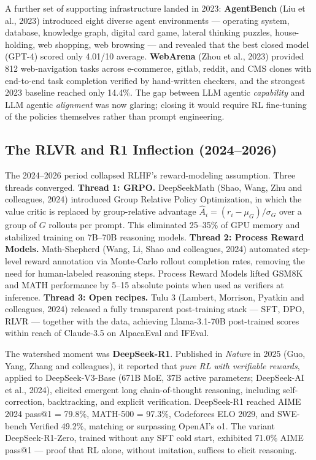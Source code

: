 A further set of supporting infrastructure landed in 2023: \textbf{AgentBench} (Liu et al., 2023) introduced eight diverse agent environments --- operating system, database, knowledge graph, digital card game, lateral thinking puzzles, house-holding, web shopping, web browsing --- and revealed that the best closed model (GPT-4) scored only 4.01/10 average. \textbf{WebArena} (Zhou et al., 2023) provided 812 web-navigation tasks across e-commerce, gitlab, reddit, and CMS clones with end-to-end task completion verified by hand-written checkers, and the strongest 2023 baseline reached only 14.4\%. The gap between LLM agentic \emph{capability} and LLM agentic \emph{alignment} was now glaring; closing it would require RL fine-tuning of the policies themselves rather than prompt engineering.

\subsection{The RLVR and R1 Inflection (2024--2026)}\label{the-rlvr-and-r1-inflection-20242026}

The 2024--2026 period collapsed RLHF's reward-modeling assumption. Three threads converged. \textbf{Thread 1: GRPO.} DeepSeekMath (Shao, Wang, Zhu and colleagues, 2024) introduced Group Relative Policy Optimization, in which the value critic is replaced by group-relative advantage \(\hat A_i = (r_i - \mu_G) / \sigma_G\) over a group of \(G\) rollouts per prompt. This eliminated 25--35\% of GPU memory and stabilized training on 7B--70B reasoning models. \textbf{Thread 2: Process Reward Models.} Math-Shepherd (Wang, Li, Shao and colleagues, 2024) automated step-level reward annotation via Monte-Carlo rollout completion rates, removing the need for human-labeled reasoning steps. Process Reward Models lifted GSM8K and MATH performance by 5--15 absolute points when used as verifiers at inference. \textbf{Thread 3: Open recipes.} Tulu 3 (Lambert, Morrison, Pyatkin and colleagues, 2024) released a fully transparent post-training stack --- SFT, DPO, RLVR --- together with the data, achieving Llama-3.1-70B post-trained scores within reach of Claude-3.5 on AlpacaEval and IFEval.

The watershed moment was \textbf{DeepSeek-R1}. Published in \emph{Nature} in 2025 (Guo, Yang, Zhang and colleagues), it reported that \emph{pure RL with verifiable rewards}, applied to DeepSeek-V3-Base (671B MoE, 37B active parameters; DeepSeek-AI et al., 2024), elicited emergent long chain-of-thought reasoning, including self-correction, backtracking, and explicit verification. DeepSeek-R1 reached AIME 2024 pass@1 = 79.8\%, MATH-500 = 97.3\%, Codeforces ELO 2029, and SWE-bench Verified 49.2\%, matching or surpassing OpenAI's o1. The variant DeepSeek-R1-Zero, trained without any SFT cold start, exhibited 71.0\% AIME pass@1 --- proof that RL alone, without imitation, suffices to elicit reasoning.

